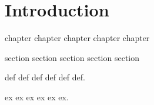 \chapter{Introduction}

chapter chapter chapter
chapter chapter


section section section
section section


\begin{group}
\begin{definition}
  def def def
  def
  def def.
\end{definition}


\begin{example}
  ex ex ex
  ex
  ex ex.
\end{example}


\end{group}
